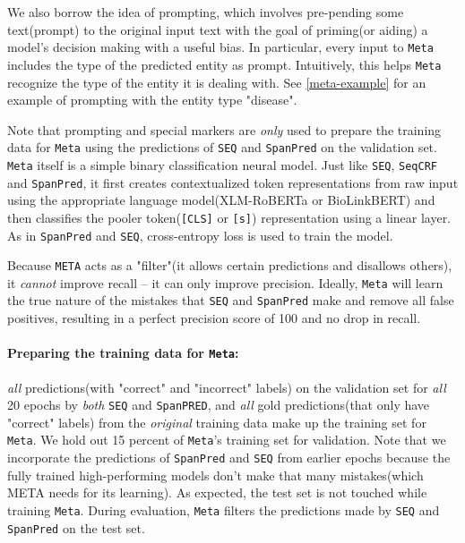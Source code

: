 \documentclass[11pt]{article}
\begin{document}
We also borrow the idea of prompting\cite{li-etal-2020-unified}, which involves pre-pending some text(prompt) to the original input text with the goal of priming(or aiding) a model's decision making with a useful bias. In particular, every input to \texttt{Meta} includes the type of the predicted entity as prompt. Intuitively, this helps \texttt{Meta}  recognize the type of the entity it is dealing with. See \autoref{meta-example} for an example of prompting with the entity type "disease".\par

 Note that prompting and special markers are \textit{only} used to prepare the training data for \texttt{Meta} using the predictions of \texttt{SEQ} and \texttt{SpanPred} on the validation set. \texttt{Meta} itself is a simple binary classification neural model. Just like \texttt{SEQ}, \texttt{SeqCRF} and \texttt{SpanPred}, it first creates contextualized token representations from raw input using the appropriate language model(XLM-RoBERTa or BioLinkBERT) and then classifies the pooler token(\texttt{[CLS]} or \texttt{[s]}) representation using a linear layer. As in \texttt{SpanPred} and \texttt{SEQ}, cross-entropy loss is used to train the model.\par

Because \texttt{META} acts as a "filter"(it allows certain predictions and disallows others), it \textit{cannot} improve recall -- it can only improve precision. Ideally, \texttt{Meta} will learn the true nature of the mistakes  that \texttt{SEQ} and \texttt{SpanPred} make and remove all false positives, resulting in a perfect precision score of 100 and no drop in recall. 

\paragraph{Preparing the training data for \texttt{Meta}:}
\textit{all} predictions(with "correct" and "incorrect" labels) on the validation set for \textit{all} 20 epochs by \textit{both} \texttt{SEQ} and \texttt{SpanPRED}, and \textit{all} gold predictions(that only have "correct" labels) from the \textit{original} training data make up the training set for \texttt{Meta}. We hold out 15 percent of \texttt{Meta}'s training set for validation. Note that we incorporate the predictions of \texttt{SpanPred} and \texttt{SEQ} from earlier epochs because the fully trained high-performing models don't make that many mistakes(which META needs for its learning). As expected, the test set is not touched while training \texttt{Meta}. During evaluation, \texttt{Meta} filters the predictions made by \texttt{SEQ} and \texttt{SpanPred} on the test set.
 
\end{document}

